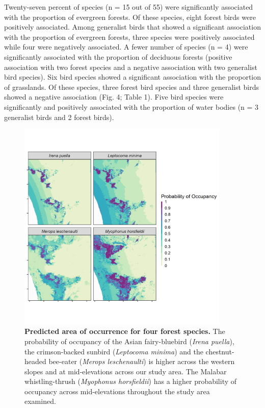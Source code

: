 Twenty-seven percent of species (n = 15 out of 55) were significantly associated with the proportion of evergreen forests.
Of these species, eight forest birds were positively associated.
Among generalist birds that showed a significant association with the proportion of evergreen forests, three species were positively associated while four were negatively associated.
A fewer number of species (n = 4) were significantly associated with the proportion of deciduous forests (positive association with two forest species and a negative association with two generalist bird species).
Six bird species showed a significant association with the proportion of grasslands.
Of these species, three forest bird species and three generalist birds showed a negative association (Fig. 4; Table 1).
Five bird species were significantly and positively associated with the proportion of water bodies (n = 3 generalist birds and 2 forest birds).

\begin{figure}[t!]
    \centering
    \includegraphics[width=0.9\textwidth]{figures/hillybirds/fig_06.png}
    \caption{
        \textbf{Predicted area of occurrence for four forest species.} 
        The probability of occupancy of the Asian fairy-bluebird (\textit{Irena puella}), the crimson-backed sunbird (\textit{Leptocoma minima}) and the chestnut-headed bee-eater (\textit{Merops leschenaulti}) is higher across the western slopes and at mid-elevations across our study area. The Malabar whistling-thrush (\textit{Myophonus horsfieldii}) has a higher probability of occupancy across mid-elevations throughout the study area examined.
    }
    \label{hilly_fig_06}
\end{figure}

